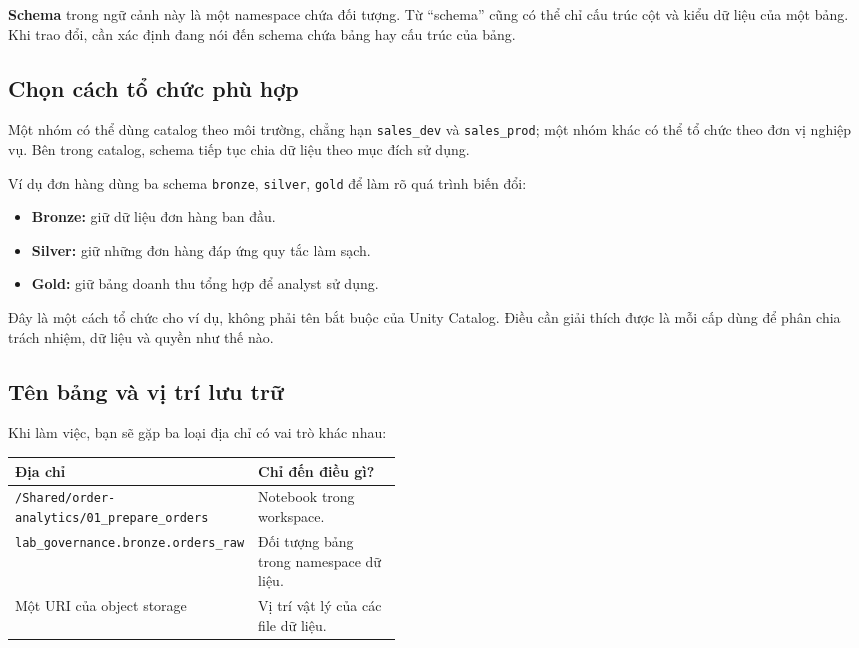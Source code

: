 \textbf{Schema} trong ngữ cảnh này là một namespace chứa đối tượng. Từ “schema” cũng có thể chỉ cấu trúc cột và kiểu dữ liệu của một bảng. Khi trao đổi, cần xác định đang nói đến schema chứa bảng hay cấu trúc của bảng.


\FloatBarrier
{}
\subsection{Chọn cách tổ chức phù hợp}

Một nhóm có thể dùng catalog theo môi trường, chẳng hạn \texttt{sales\_\allowbreak{}dev} và \texttt{sales\_\allowbreak{}prod}; một nhóm khác có thể tổ chức theo đơn vị nghiệp vụ. Bên trong catalog, schema tiếp tục chia dữ liệu theo mục đích sử dụng.


Ví dụ đơn hàng dùng ba schema \texttt{bronze}, \texttt{silver}, \texttt{gold} để làm rõ quá trình biến đổi:


\begin{itemize}
\item \textbf{Bronze:} giữ dữ liệu đơn hàng ban đầu.
\item \textbf{Silver:} giữ những đơn hàng đáp ứng quy tắc làm sạch.
\item \textbf{Gold:} giữ bảng doanh thu tổng hợp để analyst sử dụng.
\end{itemize}

Đây là một cách tổ chức cho ví dụ, không phải tên bắt buộc của Unity Catalog. Điều cần giải thích được là mỗi cấp dùng để phân chia trách nhiệm, dữ liệu và quyền như thế nào.


\FloatBarrier
{}
\subsection{Tên bảng và vị trí lưu trữ}

Khi làm việc, bạn sẽ gặp ba loại địa chỉ có vai trò khác nhau:


\begin{table}[H]
\small
\renewcommand{\arraystretch}{1.25}
\begin{tabularx}{\linewidth}{@{}p{0.45\linewidth}Y@{}}
\toprule
{}
\textbf{Địa chỉ} & \textbf{Chỉ đến điều gì?} \\
\midrule
\texttt{/\allowbreak{}Shared/\allowbreak{}order-analytics/\allowbreak{}01\_\allowbreak{}prepare\_\allowbreak{}orders} & Notebook trong workspace. \\
\texttt{lab\_\allowbreak{}governance.\allowbreak{}bronze.\allowbreak{}orders\_\allowbreak{}raw} & Đối tượng bảng trong namespace dữ liệu. \\
Một URI của object storage & Vị trí vật lý của các file dữ liệu. \\
\bottomrule
\end{tabularx}
\end{table}


